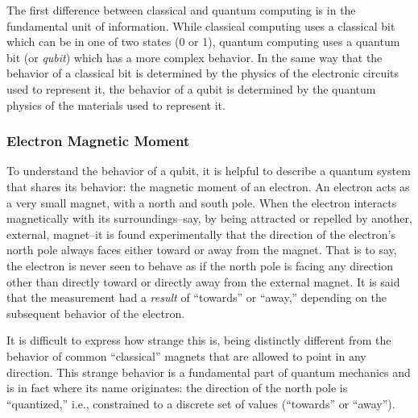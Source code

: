 \documentclass[%
 reprint,
nofootinbib,
 amsmath,amssymb,
 aps,
]{revtex4-2}
\begin{document}
The first difference between classical and quantum computing is in the fundamental unit of information. While classical computing uses a classical bit which can be in one of two states (0 or 1), quantum computing uses a quantum bit (or \textit{qubit}) which has a more complex behavior. In the same way that the behavior of a classical bit is determined by the physics of the electronic circuits used to represent it, the behavior of a qubit is determined by the quantum physics of the materials used to represent it.

\subsubsection{Electron Magnetic Moment}

To understand the behavior of a qubit, it is helpful to describe a quantum system that shares its behavior: the magnetic moment of an electron. An electron acts as a very small magnet, with a north and south pole. When the electron interacts magnetically with its surroundings--say, by being attracted or repelled by another, external, magnet--it is found experimentally that the direction of the electron's north pole always faces either toward or away from the magnet. That is to say, the electron is never seen to behave as if the north pole is facing any direction other than directly toward or directly away from the external magnet. It is said that the measurement had a \textit{result} of ``towards'' or ``away,'' depending on the subsequent behavior of the electron.

It is difficult to express how strange this is, being distinctly different from the behavior of common ``classical'' magnets that are allowed to point in any direction. This strange behavior is a fundamental part of quantum mechanics and is in fact where its name originates: the direction of the north pole is ``quantized,'' i.e., constrained to a discrete set of values (``towards'' or ``away'').
\end{document}
